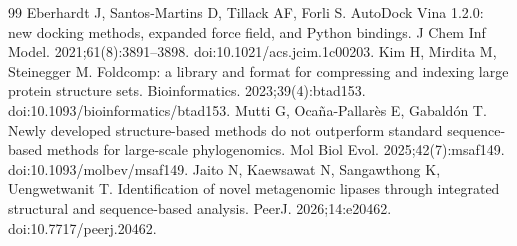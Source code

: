 \documentclass[10pt]{article}
\begin{document}
\begin{thebibliography}{99}
 Eberhardt J, Santos-Martins D, Tillack AF, Forli S. AutoDock Vina 1.2.0: new docking methods, expanded force field, and Python bindings. J Chem Inf Model. 2021;61(8):3891--3898. doi:10.1021/acs.jcim.1c00203.
 Kim H, Mirdita M, Steinegger M. Foldcomp: a library and format for compressing and indexing large protein structure sets. Bioinformatics. 2023;39(4):btad153. doi:10.1093/bioinformatics/btad153.
 Mutti G, Oca\~na-Pallar\`es E, Gabald\'on T. Newly developed structure-based methods do not outperform standard sequence-based methods for large-scale phylogenomics. Mol Biol Evol. 2025;42(7):msaf149. doi:10.1093/molbev/msaf149.
 Jaito N, Kaewsawat N, Sangawthong K, Uengwetwanit T. Identification of novel metagenomic lipases through integrated structural and sequence-based analysis. PeerJ. 2026;14:e20462. doi:10.7717/peerj.20462.
\end{thebibliography}
\end{document}
